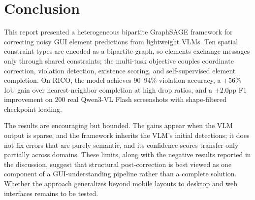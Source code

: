 \documentclass[11pt, letterpaper]{article}
\begin{document}
\section{Conclusion}
This report presented a heterogeneous bipartite GraphSAGE framework for
correcting noisy GUI element predictions from lightweight VLMs. Ten spatial
constraint types are encoded as a bipartite graph, so elements exchange
messages only through shared constraints; the multi-task objective couples
coordinate correction, violation detection, existence scoring, and
self-supervised element completion. On RICO, the model achieves 90--94\%
violation accuracy, a $+56\%$ IoU gain over nearest-neighbor completion at
high drop ratios, and a $+2.0$pp F1 improvement on 200 real Qwen3-VL Flash
screenshots with shape-filtered checkpoint loading.

The results are encouraging but bounded. The gains appear when the VLM output
is sparse, and the framework inherits the VLM's initial detections; it does
not fix errors that are purely semantic, and its confidence scores transfer
only partially across domains. These limits, along with the negative results
reported in the discussion, suggest that structural post-correction is best
viewed as one component of a GUI-understanding pipeline rather than a
complete solution. Whether the approach generalizes beyond mobile layouts to
desktop and web interfaces remains to be tested.

\clearpage


\end{document}
